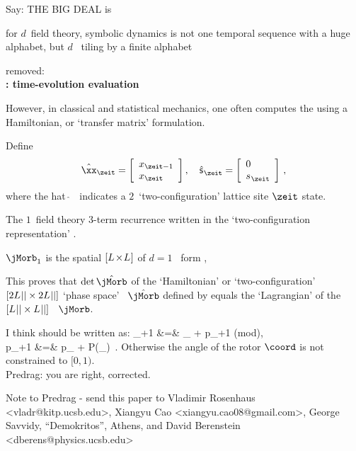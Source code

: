 \begin{description}
 {
Say: THE BIG DEAL is

for $d$\dmn\ field theory, symbolic dynamics is not one temporal sequence
with a huge alphabet, but $d$\dmn\ {\spt} tiling by a finite alphabet
   }

 {removed:\\
{\bf {\HillDet}: time-evolution evaluation}

However, in classical and statistical mechanics, one often computes the
{\HillDet} using a  Hamiltonian, or `transfer matrix' formulation.

Define
\[  %
\hat{\xx}_\zeit
=
\left[\begin{array}{l}
 {\ssp}_{\zeit-1}\\
 {\ssp}_\zeit
 \end{array}\right]
,\quad
\hat{\mathsf{\Ssym{}}}_\zeit
=
    \left[\begin{array}{l}
    {0}\\
 {\Ssym{}}_{\zeit}
 \end{array}\right]
\,,
\] %
where the hat $\hat{~}$~ indicates a $2$\dmn\
`two-configuration' lattice site $\zeit$ state.

The $1$\dmn\ field theory 3-term recurrence  written
in the \PV\rf{PerViv} `two-configuration representation'
.


$\mathbf{\jMorb}_1$ is the spatial
$[{L_{}}\!\times\!{L_{}}]$ {\jacobianOrb} of
$d=1$ \templatt\ form ,


This proves that $\det\hat{\mathbf{\jMorb}}$ of the
`Hamiltonian' or `two-configuration'
$[2{L_{}}{||}\times2{L_{}}{||}]$ `phase space'
\jacobianOrb\ $\hat{\mathbf{\jMorb}}$ defined by 
equals the `Lagrangian' {\HillDet} of the
$[{L_{}}{||}\times{\ensuremath{L_{}}}{\ensuremath{||}}]$ \jacobianOrb\
$\mathbf{\jMorb}$.
    }

     {
I think  should be written as:
\bea
\coord_{\zeit+1} &=& \coord_{\zeit} + p_{\zeit+1} \qquad  (\mbox{mod}), \\
p_{\zeit+1} &=& p_{\zeit} + P(\coord_{\zeit}) \,.
\eea
Otherwise the angle of the rotor $\coord$ is not constrained to $[0,1)$.
\\Predrag: you are right, corrected.
}

\end{description}


\bigskip\bigskip

\noindent
Note to Predrag - send this paper to
Vladimir Rosenhaus  <vladr@kitp.ucsb.edu>,
Xiangyu Cao <xiangyu.cao08@gmail.com>,
George Savvidy, ``Demokritos'', Athens,
and
David Berenstein <dberens@physics.ucsb.edu>
